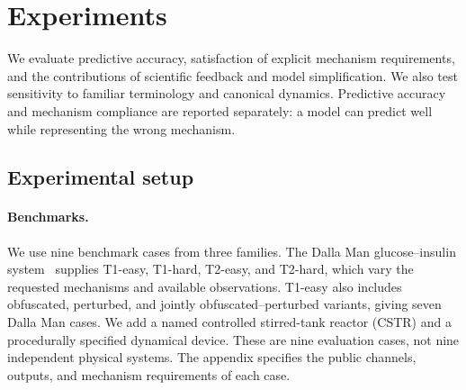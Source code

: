 \providecommand{\AFSetResult}[2]{\expandafter\def\csname AFresult:#1\endcsname{#2}}
\providecommand{\AFResult}[1]{\ifcsname AFresult:#1\endcsname\csname AFresult:#1\endcsname\else\textbf{TBD}\fi}
\providecommand{\AFCaseStudyFigures}{output/pdf/assisted-r9-case-study}

\section{Experiments}
\label{sec:experiments}

We evaluate predictive accuracy, satisfaction of explicit mechanism requirements,
and the contributions of scientific feedback and model simplification. We also
test sensitivity to familiar terminology and canonical dynamics. Predictive
accuracy and mechanism compliance are reported separately: a model can predict
well while representing the wrong mechanism.

\subsection{Experimental setup}
\label{sec:exp_setup}

\paragraph{Benchmarks.}
We use nine benchmark cases from three families. The Dalla Man glucose--insulin
system~\citep{dalla2007meal} supplies T1-easy, T1-hard, T2-easy, and T2-hard,
which vary the requested mechanisms and available observations. T1-easy also
includes obfuscated, perturbed, and jointly obfuscated--perturbed variants,
giving seven Dalla Man cases. We add a named controlled stirred-tank reactor
(CSTR) and a procedurally specified dynamical device. These are nine evaluation
cases, not nine independent physical systems. The appendix specifies the public
channels, outputs, and mechanism requirements of each case.

